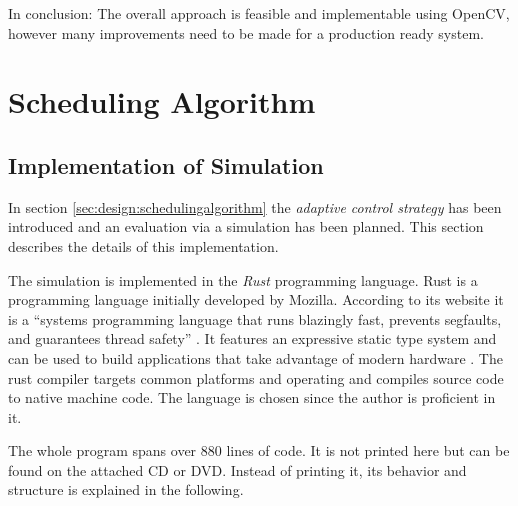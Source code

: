 In conclusion: The overall approach is feasible and implementable using OpenCV, however many improvements need to be made for a production ready system.


\section{Scheduling Algorithm}
\subsection{Implementation of Simulation}
In section \ref{sec:design:schedulingalgorithm} the \emph{adaptive control strategy} has been introduced and an evaluation via a simulation has been planned.
This section describes the details of this implementation.

The simulation is implemented in the \emph{Rust} programming language.
Rust is a programming language initially developed by Mozilla.
According to its website it is a \enquote{systems programming language that runs blazingly fast, prevents segfaults, and guarantees thread safety} \autocite{rust2018rust}.
It features an expressive static type system and can be used to build applications that take advantage of modern hardware
\autocite[][]{matsakis2014rust}.
The rust compiler targets common platforms and operating and compiles source code to native machine code.
The language is chosen since the author is proficient in it.

The whole program spans over 880 lines of code.
It is not printed here but can be found on the attached CD or DVD.
Instead of printing it, its behavior and structure is explained in the following.


